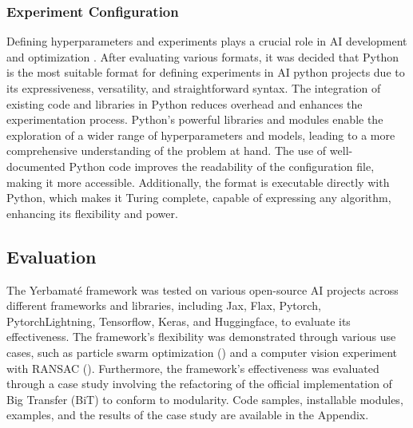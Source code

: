 \subsubsection{Experiment Configuration}

Defining hyperparameters and experiments plays a crucial role in AI development and optimization \cite{wu2019hyperparameter}. After evaluating various formats, it was decided that Python is the most suitable format for defining experiments in AI python projects due to its expressiveness, versatility, and straightforward syntax. The integration of existing code and libraries in Python reduces overhead and enhances the experimentation process. Python's powerful libraries and modules enable the exploration of a wider range of hyperparameters and models, leading to a more comprehensive understanding of the problem at hand. The use of well-documented Python code improves the readability of the configuration file, making it more accessible. Additionally, the format is executable directly with Python, which makes it Turing complete, capable of expressing any algorithm, enhancing its flexibility and power.




\subsection{Evaluation}

The Yerbamaté framework was tested on various open-source AI projects across different frameworks and libraries, including Jax, Flax, Pytorch, Pytorch\-Lightning, Tensorflow, Keras, and Huggingface, to evaluate its effectiveness. The framework's flexibility was demonstrated through various use cases, such as particle swarm optimization (\cite{kennedy1995particle}) and a computer vision experiment with RANSAC (\cite{lowe2004distinctive}). Furthermore, the framework's effectiveness was evaluated through a case study involving the refactoring of the official implementation of Big Transfer (BiT) to conform to modularity. Code samples, installable modules, examples, and the results of the case study are available in the Appendix.
